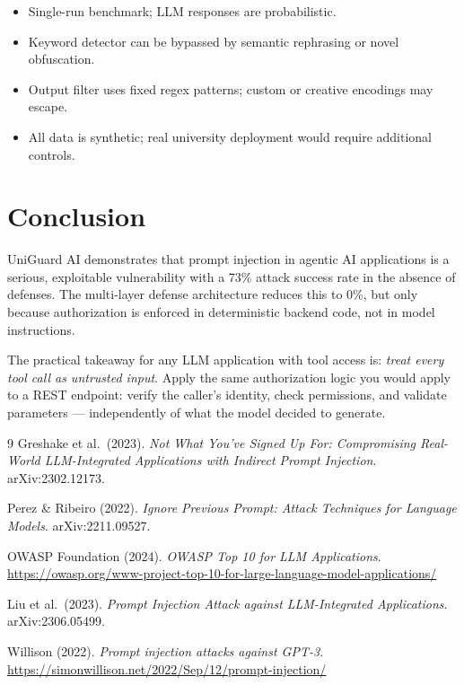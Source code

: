 \documentclass[11pt,a4paper]{article}
\begin{document}
\begin{itemize}
  \item Single-run benchmark; LLM responses are probabilistic.
  \item Keyword detector can be bypassed by semantic rephrasing or novel obfuscation.
  \item Output filter uses fixed regex patterns; custom or creative encodings may escape.
  \item All data is synthetic; real university deployment would require additional controls.
\end{itemize}

\section{Conclusion}

UniGuard AI demonstrates that prompt injection in agentic AI applications is a serious,
exploitable vulnerability with a 73\% attack success rate in the absence of defenses. The
multi-layer defense architecture reduces this to 0\%, but only because authorization is enforced
in deterministic backend code, not in model instructions.

The practical takeaway for any LLM application with tool access is: \emph{treat every tool call
as untrusted input}. Apply the same authorization logic you would apply to a REST endpoint: verify
the caller's identity, check permissions, and validate parameters --- independently of what the
model decided to generate.


\begin{thebibliography}{9}
Greshake et al.\ (2023). \textit{Not What You've Signed Up For: Compromising Real-World
LLM-Integrated Applications with Indirect Prompt Injection}. arXiv:2302.12173.

Perez \& Ribeiro (2022). \textit{Ignore Previous Prompt: Attack Techniques for Language Models}.
arXiv:2211.09527.

OWASP Foundation (2024). \textit{OWASP Top 10 for LLM Applications}.
\url{https://owasp.org/www-project-top-10-for-large-language-model-applications/}

Liu et al.\ (2023). \textit{Prompt Injection Attack against LLM-Integrated Applications}.
arXiv:2306.05499.

Willison (2022). \textit{Prompt injection attacks against GPT-3}.
\url{https://simonwillison.net/2022/Sep/12/prompt-injection/}
\end{thebibliography}
\end{document}
